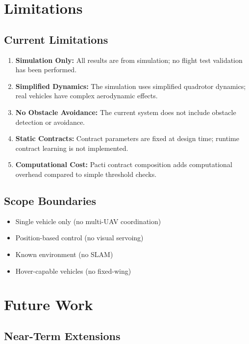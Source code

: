 \section{Limitations}

\subsection{Current Limitations}

\begin{enumerate}
    \item \textbf{Simulation Only:} All results are from simulation; no flight test validation has been performed.

    \item \textbf{Simplified Dynamics:} The simulation uses simplified quadrotor dynamics; real vehicles have complex aerodynamic effects.

    \item \textbf{No Obstacle Avoidance:} The current system does not include obstacle detection or avoidance.

    \item \textbf{Static Contracts:} Contract parameters are fixed at design time; runtime contract learning is not implemented.

    \item \textbf{Computational Cost:} Pacti contract composition adds computational overhead compared to simple threshold checks.
\end{enumerate}

\subsection{Scope Boundaries}

\begin{itemize}
    \item Single vehicle only (no multi-UAV coordination)
    \item Position-based control (no visual servoing)
    \item Known environment (no SLAM)
    \item Hover-capable vehicles (no fixed-wing)
\end{itemize}

\section{Future Work}

\subsection{Near-Term Extensions}

